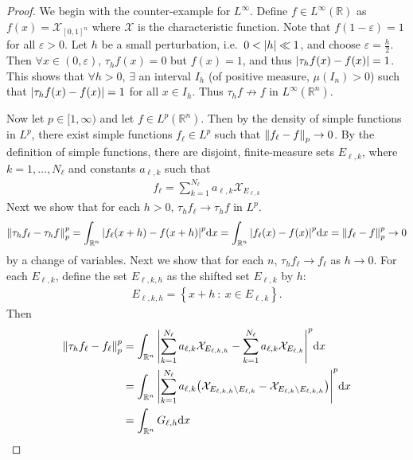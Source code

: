 \documentclass{article} %
\theoremstyle{plain}
\newcommand{\E}{\varepsilon}
\def\Rl{\mathbb{R}}
\numberwithin{equation}{section} %
\numberwithin{figure}{section} %
\numberwithin{table}{section} %
\begin{document}
\begin{proof}
    We begin with the counter-example for $L^\infty$.  Define $f \in L^\infty(\Rl)$ as $f(x) = \mathcal{X}_{[0,1]^n}$ where $\mathcal{X}$ is the characteristic function.  Note that $f(1 - \E) = 1$ for all $\E > 0$.  Let $h$ be a small perturbation, i.e.~$0 < \abs{h} \ll 1$, and choose $\E = \frac{h}{2}$.  Then $\forall x \in (0, \E)$, $\tau_hf(x) = 0$ but $f(x) = 1$, and thus $\abs{\tau_hf(x) - f(x)} = 1$.  This shows that $\forall h > 0$, $\exists$ an interval $I_h$ (of positive measure, $\mu(I_n) > 0$) such that $\abs{\tau_hf(x) - f(x)} = 1$ for all $x \in I_h$.  Thus $\tau_hf \not\rightarrow f$ in $L^\infty(\Rl^n)$.

    Now let $p \in [1,\infty)$ and let $f \in L^p(\Rl^n)$.  Then by the density of simple functions in $L^p$, there exist simple functions $f_\ell \in L^p$ such that $\norm{f_\ell - f}_p \rightarrow 0$.  By the definition of simple functions, there are disjoint, finite-measure sets $E_{\ell,k}$, where $k = 1, \dots, N_\ell$ and constants $a_{\ell,k}$ such that
    \begin{align*}
        f_\ell = \sum_{k=1}^{N_\ell} a_{\ell,k} \mathcal{X}_{E_{\ell,k}}
    \end{align*}
    Next we show that for each $h > 0$, $\tau_h f_\ell \rightarrow \tau_h f$ in $L^p$.
    \begin{align*}
        \norm{\tau_h f_\ell - \tau_h f}_p^p = \int_{\Rl^n} \abs{f_\ell(x + h) - f(x + h)}^p \dd x = \int_{\Rl^n} \abs{f_\ell(x) - f(x)}^p \dd x = \norm{f_\ell - f}_p^p \rightarrow 0
    \end{align*}
    by a change of variables.  Next we show that for each $n$, $\tau_h f_\ell \rightarrow f_\ell$ as $h \rightarrow 0$.  For each $E_{\ell,k}$, define the set $E_{\ell,k,h}$ as the shifted set $E_{\ell,k}$ by $h$:
    \begin{align*}
        E_{\ell,k,h} = \left\{x + h\ :\ x \in E_{\ell,k}\right\}.
    \end{align*}
    Then
    \begin{align*}
        \norm{\tau_h f_\ell - f_\ell}_p^p &= \int_{\Rl^n} \abs{\sum_{k=1}^{N_\ell}a_{\ell,k}\mathcal{X}_{E_{\ell,k,h}} - \sum_{k=1}^{N_\ell} a_{\ell,k}\mathcal{X}_{E_{\ell,k}}}^p \dd x \\
        &= \int_{\Rl^n} \abs{\sum_{k=1}^{N_\ell} a_{\ell,k}\qty(\mathcal{X}_{E_{\ell,k,h}\setminus E_{\ell,k}} - \mathcal{X}_{E_{\ell,k}\setminus E_{\ell,k,h}})}^p \dd x \\
        &= \int_{\Rl^n} G_{\ell,h} \dd x

\end{align*}
\end{proof}
\end{document}
